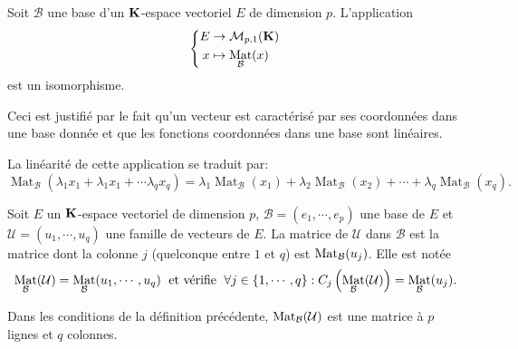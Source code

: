 \begin{propn}
 Soit $\mathcal{B}$ une base d'un $\mathbf{K}$-espace vectoriel $E$ de dimension $p$. L'application
\begin{displaymath}
 \left\lbrace 
\begin{aligned}
 E &\rightarrow \mathcal{M}_{p,1}(\mathbf{K})\\
 x&\mapsto \mathop{\mathrm{Mat}}_{\mathcal B}(x)
\end{aligned}
\right. 
\end{displaymath}
est un isomorphisme.
\end{propn}
\begin{demo}
Ceci est justifié par le fait qu'un vecteur est caractérisé par ses coordonnées dans une base donnée et que les fonctions coordonnées dans une base sont linéaires.  
\end{demo}
\begin{rem}
 La linéarité de cette application se traduit par:
\begin{displaymath}
 \mathop{\mathrm{Mat}}_{\mathcal B}(\lambda_1 x_1+\lambda_1 x_1+\cdots \lambda_q x_q)
= \lambda_1 \mathop{\mathrm{Mat}}_{\mathcal B}(x_1) + \lambda_2 \mathop{\mathrm{Mat}}_{\mathcal B}(x_2) +\cdots +
\lambda_q \mathop{\mathrm{Mat}}_{\mathcal B}(x_q).
\end{displaymath}
\end{rem}

\begin{defi}
 Soit $E$ un $\mathbf{K}$-espace vectoriel de dimension $p$, $\mathcal B = (e_1,\cdots,e_p)$ une base de $E$ et $\mathcal U=(u_1,\cdots,u_q)$ une famille de vecteurs de $E$.  La matrice de $\mathcal U$ dans $\mathcal B$ est la matrice dont la colonne $j$ (quelconque entre $1$ et $q$) est $\mathop{\mathrm{Mat}}_\mathcal B(u_j)$. 
Elle est notée
\[
 \mathop{\mathrm{Mat}}_\mathcal B(\mathcal U) = \mathop{\mathrm{Mat}}_\mathcal B(u_1,\cdots,u_q)\;
\text{ et vérifie }\;
 \forall j\in\{1,\cdots,q\} : C_j\left( \mathop{\mathrm{Mat}}_\mathcal B(\mathcal U)\right) = \mathop{\mathrm{Mat}}_\mathcal B(u_j).
\]
\end{defi}
\begin{rem}
 Dans les conditions de la définition précédente, $\mathop{\mathrm{Mat}}_\mathcal B(\mathcal U)$ est une matrice à $p$ lignes et $q$ colonnes.
\end{rem}

